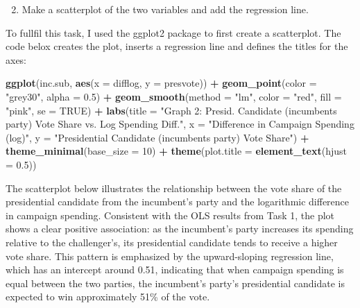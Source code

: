 \documentclass[
]{article}
\newenvironment{Shaded}{\begin{snugshade}}{\end{snugshade}}
\newcommand{\AttributeTok}[1]{\textcolor[rgb]{0.13,0.29,0.53}{#1}}
\newcommand{\ConstantTok}[1]{\textcolor[rgb]{0.56,0.35,0.01}{#1}}
\newcommand{\DecValTok}[1]{\textcolor[rgb]{0.00,0.00,0.81}{#1}}
\newcommand{\FloatTok}[1]{\textcolor[rgb]{0.00,0.00,0.81}{#1}}
\newcommand{\FunctionTok}[1]{\textcolor[rgb]{0.13,0.29,0.53}{\textbf{#1}}}
\newcommand{\NormalTok}[1]{#1}
\newcommand{\SpecialCharTok}[1]{\textcolor[rgb]{0.81,0.36,0.00}{\textbf{#1}}}
\newcommand{\StringTok}[1]{\textcolor[rgb]{0.31,0.60,0.02}{#1}}
\begin{document}
\begin{enumerate}\setcounter{enumi}{1}
	\item Make a scatterplot of the two variables and add the regression line. 
\end{enumerate}
To fullfil this task, I used the ggplot2 package to first create a scatterplot. The code belox creates the plot, inserts a regression line and defines the titles for the axes:
\begin{Shaded}
	\begin{Highlighting}[]
\FunctionTok{ggplot}\NormalTok{(inc.sub, }\FunctionTok{aes}\NormalTok{(}\AttributeTok{x =}\NormalTok{ difflog, }\AttributeTok{y =}\NormalTok{ presvote)) }\SpecialCharTok{+}
	\FunctionTok{geom\_point}\NormalTok{(}\AttributeTok{color =} \StringTok{"grey30"}\NormalTok{, }\AttributeTok{alpha =} \FloatTok{0.5}\NormalTok{) }\SpecialCharTok{+}          
	\FunctionTok{geom\_smooth}\NormalTok{(}\AttributeTok{method =} \StringTok{"lm"}\NormalTok{, }\AttributeTok{color =} \StringTok{"red"}\NormalTok{, }\AttributeTok{fill =} \StringTok{"pink"}\NormalTok{, }\AttributeTok{se =} \ConstantTok{TRUE}\NormalTok{) }\SpecialCharTok{+}  
	\FunctionTok{labs}\NormalTok{(}\AttributeTok{title =} \StringTok{"Graph 2: Presid. Candidate (incumbent\textquotesingle{}s party) Vote Share vs. Log Spending Diff."}\NormalTok{,}
	\AttributeTok{x =} \StringTok{"Difference in Campaign Spending (log)"}\NormalTok{,}
	\AttributeTok{y =} \StringTok{"Presidential Candidate (incumbent\textquotesingle{}s party) Vote Share"}\NormalTok{) }\SpecialCharTok{+}
	\FunctionTok{theme\_minimal}\NormalTok{(}\AttributeTok{base\_size =} \DecValTok{10}\NormalTok{) }\SpecialCharTok{+}
	\FunctionTok{theme}\NormalTok{(}\AttributeTok{plot.title =} \FunctionTok{element\_text}\NormalTok{(}\AttributeTok{hjust =} \FloatTok{0.5}\NormalTok{))}
	\end{Highlighting}
\end{Shaded}


The scatterplot below illustrates the relationship between the vote share of the presidential candidate from the incumbent’s party and the logarithmic difference in campaign spending. Consistent with the OLS results from Task 1, the plot shows a clear positive association: as the incumbent’s party increases its spending relative to the challenger’s, its presidential candidate tends to receive a higher vote share. This pattern is emphasized by the upward-sloping regression line, which has an intercept around 0.51, indicating that when campaign spending is equal between the two parties, the incumbent’s party’s presidential candidate is expected to win approximately 51\% of the vote.
\end{document}

